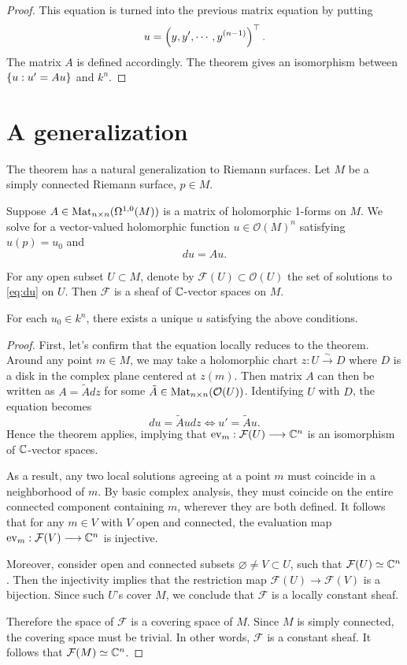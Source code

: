 \documentclass{article}
\begin{document}
\begin{proof}
    This equation is turned into the previous matrix equation by putting
    \[
        u = \left(y,y',\cdots,y^{(n-1)}\right)^\top.
    \]
    The matrix $A$ is defined accordingly. The theorem gives an isomorphism between $\left\{u:u'=Au\right\}$ and $k^n$.
\end{proof}

\section{A generalization}

The theorem has a natural generalization to Riemann surfaces. Let $M$ be a simply connected Riemann surface, $p\in M$.

Suppose $A\in\operatorname{Mat}_{n\times n}(\Omega^{1,0}(M))$ is a matrix of holomorphic 1-forms on $M$. We solve for a vector-valued holomorphic function $u\in\mathcal{O}(M)^n$ satisfying $u(p)=u_0$ and
\begin{equation}\label{eq:du}
    du=Au.
\end{equation}

For any open subset $U\subset M$, denote by $\mathcal{F}(U)\subset\mathcal{O}(U)$ the set of solutions to \eqref{eq:du} on $U$. Then $\mathcal{F}$ is a sheaf of $\mathbb{C}$-vector spaces on $M$. 

\begin{corollary}
    For each $u_0\in k^n$, there exists a unique $u$ satisfying the above conditions.
\end{corollary}

\begin{proof}
    First, let's confirm that the equation locally reduces to the theorem. Around any point $m\in M$, we may take a holomorphic chart $z:U\xrightarrow{\sim} D$ where $D$ is a disk in the complex plane centered at $z(m)$. Then matrix $A$ can then be written as $A=\tilde{A}dz$ for some $\tilde{A}\in\operatorname{Mat}_{n\times n}(\mathcal{O}(U))$. Identifying $U$ with $D$, the equation becomes 
    \[
        du=\tilde{A}u dz \Longleftrightarrow u'=\tilde{A}u.
    \]
    Hence the theorem applies, implying that $\operatorname{ev}_m:\mathcal{F}(U)\longrightarrow\mathbb{C}^n$ is an isomorphism of $\mathbb{C}$-vector spaces.

    As a result, any two local solutions agreeing at a point $m$ must coincide in a neighborhood of $m$. By basic complex analysis, they must coincide on the entire connected component containing $m$, wherever they are both defined. It follows that for any $m\in V$ with $V$ open and connected, the evaluation map $\operatorname{ev}_m:\mathcal{F}(V)\longrightarrow\mathbb{C}^n$ is injective.

    Moreover, consider open and connected subsets $\varnothing\neq V\subset U$, such that $\mathcal{F}(U)\simeq\mathbb{C}^n$. Then the injectivity implies that the restriction map $\mathcal{F}(U)\longrightarrow\mathcal{F}(V)$ is a bijection. Since such $U$'s cover $M$, we conclude that $\mathcal{F}$ is a locally constant sheaf.

    Therefore the \etale space of $\mathcal{F}$ is a covering space of $M$. Since $M$ is simply connected, the covering space must be trivial. In other words, $\mathcal{F}$ is a constant sheaf. It follows that $\mathcal{F}(M)\simeq\mathbb{C}^n$.
\end{proof}
\end{document}
